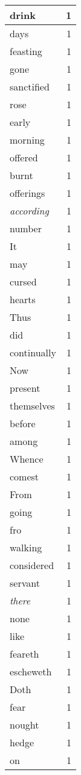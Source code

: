 \begin{center}
\begin{longtable}{l|r}
drink & 1\\ \hline 
days & 1\\ \hline 
feasting & 1\\ \hline 
gone & 1\\ \hline 
sanctified & 1\\ \hline 
rose & 1\\ \hline 
early & 1\\ \hline 
morning & 1\\ \hline 
offered & 1\\ \hline 
burnt & 1\\ \hline 
offerings & 1\\ \hline 
\emph{according} & 1\\ \hline 
number & 1\\ \hline 
It & 1\\ \hline 
may & 1\\ \hline 
cursed & 1\\ \hline 
hearts & 1\\ \hline 
Thus & 1\\ \hline 
did & 1\\ \hline 
continually & 1\\ \hline 
Now & 1\\ \hline 
present & 1\\ \hline 
themselves & 1\\ \hline 
before & 1\\ \hline 
among & 1\\ \hline 
Whence & 1\\ \hline 
comest & 1\\ \hline 
From & 1\\ \hline 
going & 1\\ \hline 
fro & 1\\ \hline 
walking & 1\\ \hline 
considered & 1\\ \hline 
servant & 1\\ \hline 
\emph{there} & 1\\ \hline 
none & 1\\ \hline 
like & 1\\ \hline 
feareth & 1\\ \hline 
escheweth & 1\\ \hline 
Doth & 1\\ \hline 
fear & 1\\ \hline 
nought & 1\\ \hline 
hedge & 1\\ \hline 
on & 1\\ \hline 

\end{longtable}
\end{center}
